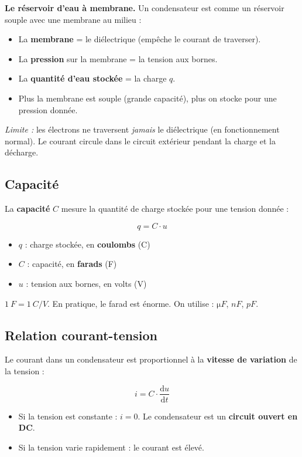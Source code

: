 \documentclass[12pt,a4paper,twoside]{book}
\begin{document}
\begin{analogie}
\textbf{Le réservoir d'eau à membrane.} Un condensateur est comme un réservoir souple avec une membrane au milieu :
\begin{itemize}[nosep]
\item La \textbf{membrane} = le diélectrique (empêche le courant de traverser).
\item La \textbf{pression} sur la membrane = la tension aux bornes.
\item La \textbf{quantité d'eau stockée} = la charge $q$.
\item Plus la membrane est souple (grande capacité), plus on stocke pour une pression donnée.
\end{itemize}
\textit{Limite :} les électrons ne traversent \textit{jamais} le diélectrique (en fonctionnement normal). Le courant circule dans le circuit extérieur pendant la charge et la décharge.
\end{analogie}

\subsection{Capacité}

La \textbf{capacité} $C$ mesure la quantité de charge stockée pour une tension donnée :

\begin{formule}
\[
\boxed{q = C \cdot u}
\]
\begin{itemize}[nosep]
\item $q$ : charge stockée, en \textbf{coulombs} (C)
\item $C$ : capacité, en \textbf{farads} (F)
\item $u$ : tension aux bornes, en volts (V)
\end{itemize}
\vspace{0.2cm}
$\SI{1}{F} = \SI{1}{C/V}$. En pratique, le farad est énorme. On utilise : $\si{\micro F}$, $\si{nF}$, $\si{pF}$.
\end{formule}

\subsection{Relation courant-tension}

Le courant dans un condensateur est proportionnel à la \textbf{vitesse de variation} de la tension :

\begin{formule}
\[
\boxed{i = C \cdot \frac{\mathrm{d}u}{\mathrm{d}t}}
\]
\begin{itemize}[nosep]
\item Si la tension est constante : $i = 0$. Le condensateur est un \textbf{circuit ouvert en DC}.
\item Si la tension varie rapidement : le courant est élevé.
\end{itemize}
\end{formule}
\end{document}
